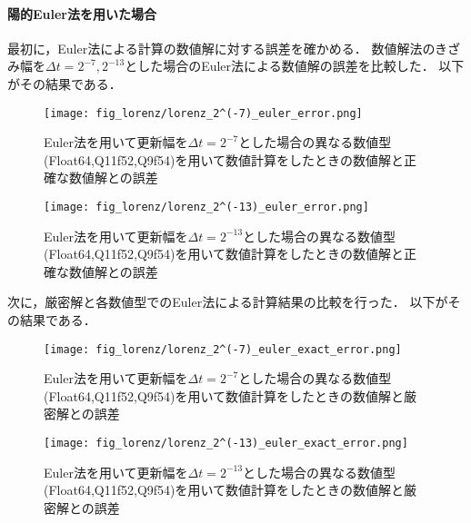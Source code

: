 \paragraph*{陽的Euler法を用いた場合}
最初に，Euler法による計算の数値解に対する誤差を確かめる．
数値解法のきざみ幅を$\Delta t = 2^{-7},2^{-13}$とした場合のEuler法による数値解の誤差を比較した．
以下がその結果である．
\begin{figure}[H]
    \centering
    \begin{minipage}[b]{0.49\columnwidth}
        \centering
        \texttt{[image: fig\_lorenz/lorenz\_2^(-7)\_euler\_error.png]}
        \caption{Euler法を用いて更新幅を$\Delta t = 2^{-7}$とした場合の異なる数値型(Float64,Q11f52,Q9f54)を用いて数値計算をしたときの数値解と正確な数値解との誤差}
        \label{fig:lorenz_2^(-7)_euler_error}
    \end{minipage}
    \begin{minipage}[b]{0.49\columnwidth}
        \centering
        \texttt{[image: fig\_lorenz/lorenz\_2^(-13)\_euler\_error.png]}
        \caption{Euler法を用いて更新幅を$\Delta t =  2^{-13}$とした場合の異なる数値型(Float64,Q11f52,Q9f54)を用いて数値計算をしたときの数値解と正確な数値解との誤差}
        \label{fig:lorenz_2^(-13)_euler_error}
    \end{minipage}
\end{figure}
次に，厳密解と各数値型でのEuler法による計算結果の比較を行った．
以下がその結果である．
\begin{figure}[H]
    \centering
    \begin{minipage}[b]{0.49\columnwidth}
        \centering
        \texttt{[image: fig\_lorenz/lorenz\_2^(-7)\_euler\_exact\_error.png]}
        \caption{Euler法を用いて更新幅を$\Delta t = 2^{-7}$とした場合の異なる数値型(Float64,Q11f52,Q9f54)を用いて数値計算をしたときの数値解と厳密解との誤差}
        \label{fig:lorenz_2^(-7)_euler_exact_error}
    \end{minipage}
    \begin{minipage}[b]{0.49\columnwidth}
        \centering
        \texttt{[image: fig\_lorenz/lorenz\_2^(-13)\_euler\_exact\_error.png]}
        \caption{Euler法を用いて更新幅を$\Delta t =  2^{-13}$とした場合の異なる数値型(Float64,Q11f52,Q9f54)を用いて数値計算をしたときの数値解と厳密解との誤差}
        \label{fig:lorenz_2^(-13)_euler_exact_error}
    \end{minipage}
\end{figure}


